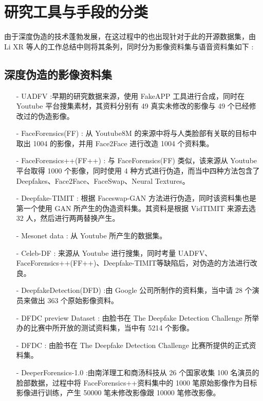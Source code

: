 \chapter{研究工具与手段的分类}
\label{chap:2}

由于深度伪造的技术蓬勃发展，在这过程中的也出现针对于此的开源数据集，由 Li XR 等人的工作总结中则将其条列，同时分为影像资料集与语音资料集如下 :

\section{深度伪造的影像资料集}

\begin{itemize}
\item [-] UADFV \cite{matern2019exploiting}:早期的研究数据来源，使用 FakeAPP \cite{list1141} 工具进行合成，同时在 Youtube 平台搜集素材，其资料分别有 49 真实未修改的影像与 49 个已经修改过的伪造影像。

\item [-] FaceForensics(FF) \cite{rossler2018faceforensics}: 从 Youtube8M \cite{abu2016youtube} 的来源中将与人类脸部有关联的目标中取出 1004 的影像，并用 Face2Face 进行改造 1004 个资料集。

\item [-] FaceForensics++(FF++) \cite{rossler2019faceforensics++}: 与 FaceForensics(FF) 类似，该来源从 Youtube 平台取得 1000 个影像，同时使用 4 种方式进行伪造，而当中四种方法包含了 Deepfakes、Face2Face、FaceSwap、Neural Textures。

\item [-] Deepfake-TIMIT \cite{korshunov2018deepfakes}: 根据 Faceswap-GAN 方法进行伪造，同时该资料集也是第一个使用 GAN 所产生的伪造资料集。其资料是根据 VidTIMIT 来源去选 32 人，然后进行两两替换产生。

\item [-]Mesonet data \cite{afchar2018mesonet}: 从 Youtube 所产生的数据集。

\item [-]Celeb-DF \cite{li2019celeb}: 来源从 Youtube 进行搜集，同时考量 UADFV、FaceForensics++(FF++)、Deepfake-TIMIT等缺陷后，对伪造的方法进行改良。

\item [-] DeepfakeDetection(DFD) \cite{list1067}:由 Google 公司所制作的资料集，当中请 28 个演员来做出 363 个原始影像资料。

\item [-] DFDC preview Dataset \cite{dolhansky2019deepfake}: 由脸书在 The Deepfake Detection Challenge 所举办的比赛中所开放的测试资料集，当中有 5214 个影像。

\item [-] DFDC \cite{list1069}: 由脸书在 The Deepfake Detection Challenge 比赛所提供的正式资料集。

\item [-] DeeperForensics-1.0 \cite{jiang2020deeperforensics}:由南洋理工和商汤科技从 26 个国家收集 100 名演员的脸部数据，过程中将 FaceForensics++资料集中的 1000 笔原始影像作为目标影像进行训练，产生 50000 笔未修改影像跟 10000 笔修改影像。
\end{itemize}

